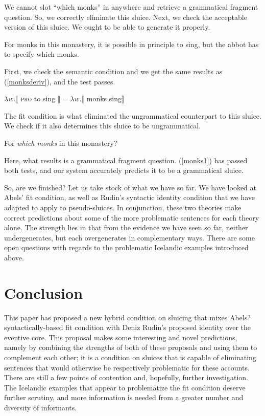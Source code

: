 \documentclass{turabian-researchpaper}
\begin{document}
We cannot slot ``which monks'' in anywhere and retrieve a grammatical fragment question. So, we correctly eliminate this sluice. Next, we check the acceptable version of this sluice. We ought to be able to generate it properly. 

\begin{exe}
 For monks in this monastery, it is possible in principle to sing, but the abbot has to specify which monks. 
\end{exe}

First, we check the semantic condition and we get the same results as (\ref{monksderiv}), and the test passes. 

\begin{exe}
\ex  $\lambda w.\llbracket$ \textsc{pro} to sing $\rrbracket =  \lambda w.\llbracket$ monks sing$\rrbracket$ 
\end{exe}

The fit condition is what eliminated the ungrammatical counterpart to this sluice. We check if it also determines this sluice to be ungrammatical. 

\begin{exe}
\ex For \textit{which monks} in this monastery?
\end{exe}

Here, what results is a grammatical fragment question. (\ref{monks1}) has passed both tests, and our system accurately predicts it to be a grammatical sluice. 

So, are we finished? Let us take stock of what we have so far. We have looked at Abels' fit condition, as well as Rudin's syntactic identity condition that we have adapted to apply to pseudo-sluices. In conjunction, these two theories make correct predictions about some of the more problematic sentences for each theory alone. The strength lies in that from the evidence we have seen so far, neither undergenerates, but each overgenerates in complementary ways. There are some open questions with regards to the problematic Icelandic examples introduced above. 

\section{Conclusion}
This paper has proposed a new hybrid condition on sluicing that mixes Abels? syntactically-based fit condition with Deniz Rudin's proposed identity over the eventive core. This proposal makes some interesting and novel predictions, namely by combining the strengths of both of these proposals and using them to complement each other; it is a condition on sluices that is capable of eliminating sentences that would otherwise be respectively problematic for these accounts. There are still a few points of contention and, hopefully, further investigation. The Icelandic examples that appear to problematize the fit condition deserve further scrutiny, and more information is needed from a greater number and diversity of informants. 
\end{document}
